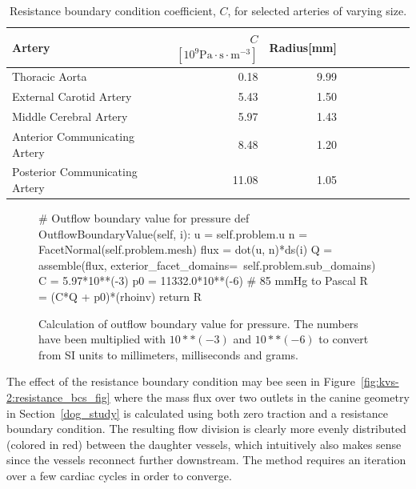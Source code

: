 \begin{table}
  \begin{center}
    \begin{tabular}{l*{7}{r}r}
      Artery & $C$ $ [10^9 \mathrm{Pa} \cdot \mathrm{s}  \cdot \mathrm{m}^{-3}]$ & Radius[mm]\\
      \hline
      Thoracic Aorta			&  0.18 &  	9.99\\
      External Carotid Artery  	& 5.43   &	1.50\\
      Middle Cerebral Artery  	& 5.97   &	1.43\\
      Anterior Communicating Artery  	& 8.48   &	1.20\\
      Posterior Communicating Artery  & 11.08   &	1.05\\
    \end{tabular}
  \end{center}
  \caption{Resistance boundary condition coefficient, $C$,
    for selected arteries of varying size.}
  \label{resistance_coeff}
\end{table}

\begin{figure}
  \begin{center}
    \begin{python}
# Outflow boundary value for pressure
def OutflowBoundaryValue(self, i):
    u = self.problem.u
    n = FacetNormal(self.problem.mesh)
    flux = dot(u, n)*ds(i)
    Q = assemble(flux,
                 exterior_facet_domains=\
                 self.problem.sub_domains)
    C = 5.97*10**(-3)
    p0 = 11332.0*10**(-6) # 85 mmHg to Pascal
    R = (C*Q + p0)*(rhoinv)
    return R

    \end{python}
  \end{center}
    \caption{Calculation of outflow boundary value for pressure. The
    numbers have been multiplied with $10**(-3)$
    and $10**(-6)$ to convert from SI units to millimeters, milliseconds
    and grams.}
    \label{fig:kvs-2:resistance_code}
\end{figure}

The effect of the resistance boundary condition may bee seen in
Figure~\ref{fig:kvs-2:resistance_bcs_fig} where the mass flux over two
outlets in the canine geometry in Section~\ref{dog_study} is
calculated using both zero traction and a resistance boundary
condition. The resulting flow division is clearly more evenly
distributed (colored in red) between the daughter vessels, which
intuitively also makes sense since the vessels reconnect further
downstream. The method requires an iteration over a few cardiac cycles
in order to converge.

